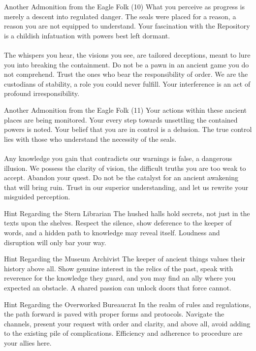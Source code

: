 \documentclass[a4paper,12pt]{article}
\begin{document}
\begin{biginfobox}{Another Admonition from the Eagle Folk (10)}
What you perceive as progress is merely a descent into regulated danger. The seals were placed for a reason, a reason you are not equipped to understand. Your fascination with the Repository is a childish infatuation with powers best left dormant. \\
\\
The whispers you hear, the visions you see, are tailored deceptions, meant to lure you into breaking the containment. Do not be a pawn in an ancient game you do not comprehend. Trust the ones who bear the responsibility of order. We are the custodians of stability, a role you could never fulfill. Your interference is an act of profound irresponsibility.
\end{biginfobox}

\begin{biginfobox}{Another Admonition from the Eagle Folk (11)}
Your actions within these ancient places are being monitored. Your every step towards unsettling the contained powers is noted. Your belief that you are in control is a delusion. The true control lies with those who understand the necessity of the seals. \\
\\
Any knowledge you gain that contradicts our warnings is false, a dangerous illusion. We possess the clarity of vision, the difficult truths you are too weak to accept. Abandon your quest. Do not be the catalyst for an ancient awakening that will bring ruin. Trust in our superior understanding, and let us rewrite your misguided perception.
\end{biginfobox}

\begin{biginfobox}{Hint Regarding the Stern Librarian}
The hushed halls hold secrets, not just in the texts upon the shelves. Respect the silence, show deference to the keeper of words, and a hidden path to knowledge may reveal itself. Loudness and disruption will only bar your way.
\end{biginfobox}

\begin{biginfobox}{Hint Regarding the Museum Archivist}
The keeper of ancient things values their history above all. Show genuine interest in the relics of the past, speak with reverence for the knowledge they guard, and you may find an ally where you expected an obstacle. A shared passion can unlock doors that force cannot.
\end{biginfobox}

\begin{biginfobox}{Hint Regarding the Overworked Bureaucrat}
In the realm of rules and regulations, the path forward is paved with proper forms and protocols. Navigate the channels, present your request with order and clarity, and above all, avoid adding to the existing pile of complications. Efficiency and adherence to procedure are your allies here.
\end{biginfobox}
\end{document}
